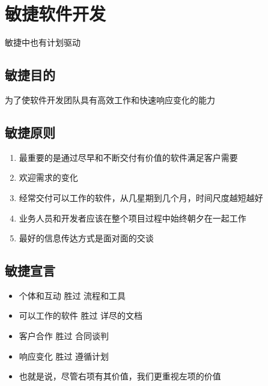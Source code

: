 \section{敏捷软件开发}
敏捷中也有计划驱动

\subsection{敏捷目的}
为了使软件开发团队具有高效工作和快速响应变化的能力

\subsection{敏捷原则}
\vspace{-0.8em}
\begin{multicols}{2}
    \begin{enumerate}[label=\arabic*.]
        \item 最重要的是通过尽早和不断交付有价值的软件满足客户需要
        \item 欢迎需求的变化
        \item 经常交付可以工作的软件，从几星期到几个月，时间尺度越短越好
        \item 业务人员和开发者应该在整个项目过程中始终朝夕在一起工作
        \item 最好的信息传达方式是面对面的交谈
    \end{enumerate}
\end{multicols}
\vspace{-1em}


\subsection{敏捷宣言}
\vspace{-0.8em}
\begin{multicols}{2}
    \begin{itemize}
        \item 个体和互动 胜过 流程和工具
        \item 可以工作的软件 胜过 详尽的文档
        \item 客户合作 胜过 合同谈判
        \item 响应变化 胜过 遵循计划
    \end{itemize}
\end{multicols}
\vspace{-1em}
\vspace{-0.4em}
\begin{itemize}
    \item 也就是说，尽管右项有其价值，我们更重视左项的价值
\end{itemize}

